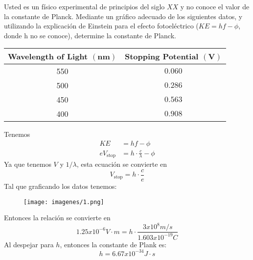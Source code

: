     
    \begin{problema}
    
    Usted es un físico experimental de principios del siglo $X X$ y no conoce el valor de la constante de Planck. Mediante un gráfico adecuado de los siguientes datos, y utilizando la explicación de Einstein para el efecto fotoeléctrico ($K E=h f-\phi$, donde h no se conoce), determine la constante de Planck.
    \begin{center}
        \begin{tabular}{cc}
            Wavelength of Light $(\mathbf{n m})$ & Stopping Potential $(\mathbf{V})$ \\
            \hline 550 & $0.060$ \\
            \hline 500 & $0.286$ \\
            \hline 450 & $0.563$ \\
            \hline 400 & $0.908$ \\
            \hline
            \end{tabular}
    \end{center}
    
    \begin{sol}
        Tenemos 
        \begin{align*}
            K E&=h f-\phi\\
            eV_{\text{stop}}&= h\cdot \frac{c}{\lambda}-\phi
        \end{align*}
        Ya que tenemos $V$ y $1/\lambda$, esta ecuación se convierte en
         $$V_{\text{stop}}= h\cdot \frac{c}{e}$$
         Tal que graficando los datos tenemos: 
         \begin{figure}[H]
            \centering
            \texttt{[image: imagenes/1.png]}
         \end{figure}
        Entonces la relación se convierte en 
        $$1.25x10^{-6} V\cdot m= h\cdot \frac{3x10^8 m/s}{1.603 x10^{-19}C}$$
        Al despejar para $h$, entonces la constante de Plank es: 
        $$h=6.67x10^{-34}J\cdot s$$
    \end{sol}
    \end{problema}
    
